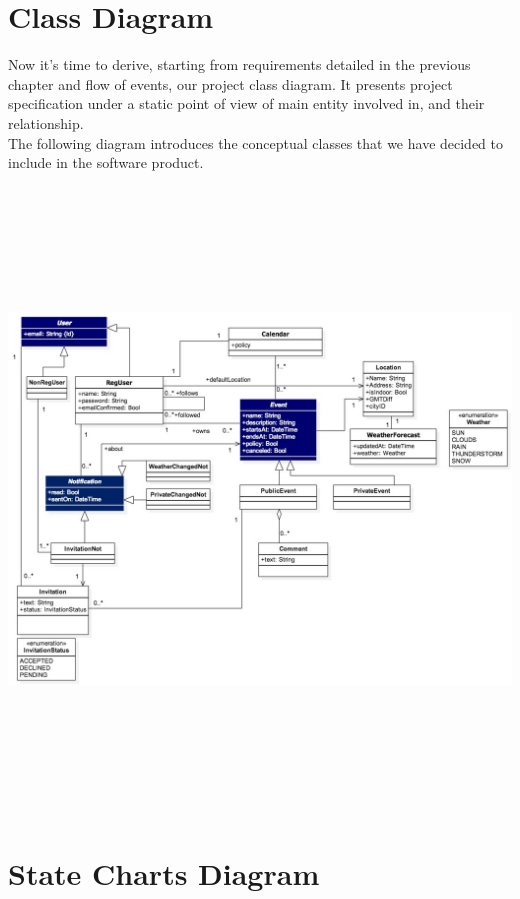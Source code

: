 \documentclass[12pt]{book}
\begin{document}
\section{Class Diagram}

Now it's time to derive, starting from requirements detailed in the previous chapter and flow of events, our project class diagram. It presents project specification under a static point of view of main entity involved in, and their relationship. \\
The following diagram introduces the conceptual classes that we have decided to include in the software product. 

\begin{landscape}
\begin{center}
\includegraphics[width=25cm, height=16.5cm]{UML}\\
\end{center}
\end{landscape}

\section{State Charts Diagram}
\end{document}
